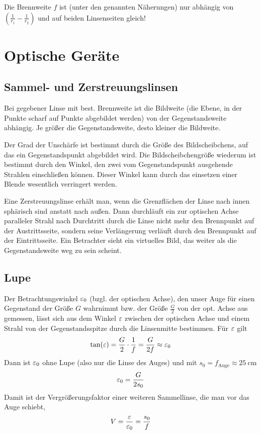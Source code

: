  Die Brennweite $f$ ist (unter den genannten Näherungen)
nur abhängig von $\left( \frac{1}{r_1}-\frac{1}{r_2} \right)$ und auf
beiden Linsenseiten gleich!

\section{Optische Geräte}
\subsection{Sammel- und Zerstreuungslinsen}
Bei gegebener Linse mit best. Brennweite ist die Bildweite (die Ebene,
in der Punkte scharf auf Punkte abgebildet werden) von der
Gegenstandsweite abhängig.
Je größer die Gegenstandsweite, desto kleiner die Bildweite.

Der Grad der Unschärfe ist bestimmt durch die Größe des
Bildscheibchens, auf das ein Gegenstandspunkt abgebildet wird. Die
Bildscheibchengröße wiederum ist bestimmt durch den Winkel, den zwei
vom Gegenstandspunkt ausgehende Strahlen einschließen können.
Dieser Winkel kann durch das einsetzen einer Blende wesentlich
verringert werden.

Eine Zerstreuungslinse erhält man, wenn die Grenzflächen der Linse
nach innen sphärisch sind anstatt nach außen.
Dann durchläuft ein zur optischen Achse paralleler Strahl nach
Durchtritt durch die Linse nicht mehr den Brennpunkt auf der Austrittsseite,
sondern seine Verlängerung verläuft durch den Brennpunkt auf der Eintrittsseite.
Ein Betrachter sieht ein virtuelles Bild, das weiter als die
Gegenstandsweite weg zu sein scheint.

\subsection{Lupe}
Der Betrachtungswinkel $\varepsilon_0$ (bzgl. der optischen Achse), den unser
Auge für einen Gegenstand der Größe $G$ wahrnimmt
bzw. der Größe $\frac{G}{2}$ von der opt. Achse aus gemessen,
lässt sich aus dem Winkel $\varepsilon$ zwischen der optischen Achse und
einem Strahl von der Gegenstandsspitze durch die Linsenmitte
bestimmen.
Für $\varepsilon$ gilt
\begin{gather*}
  \tan(\varepsilon) = \frac{G}{2 }\cdot\frac{1}{f} =\frac{G}{2f} \approx
  \varepsilon_0
\end{gather*}
Dann ist $\varepsilon_0$ ohne Lupe (also nur die Linse des Auges) und mit
$s_0=f_\text{Auge}\approx \SI{25}{\centi\meter}$
\begin{gather*}
  \varepsilon_0 = \frac{G}{2 s_0}
\end{gather*}
Damit ist der Vergrößerungsfaktor einer weiteren Sammellinse, die man
vor das Auge schiebt,
\begin{gather*}
  V = \frac{\varepsilon}{\varepsilon_0} = \frac{s_0}{f}
\end{gather*}

